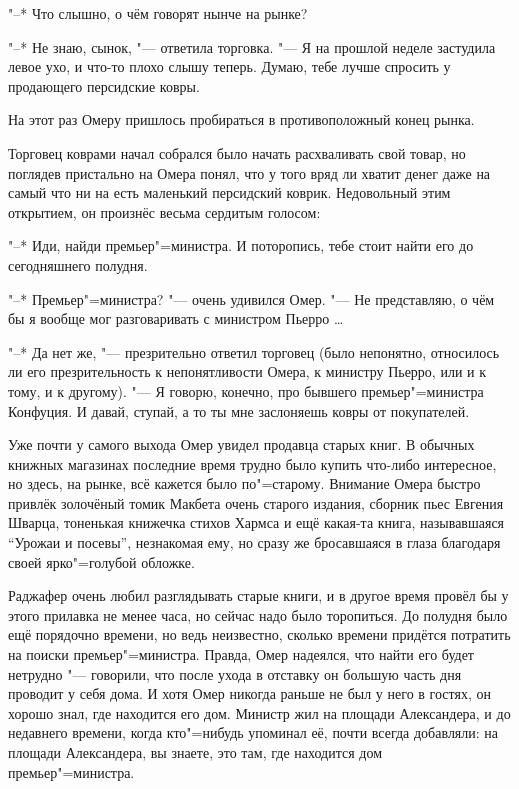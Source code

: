 "--* Что слышно, о чём говорят нынче на рынке?

"--* Не знаю, сынок, "--- ответила торговка.
"--- Я на прошлой неделе застудила левое ухо, и что-то плохо слышу теперь.
Думаю, тебе лучше спросить у продающего персидские ковры.

На этот раз Омеру пришлось пробираться в противоположный конец рынка.

Торговец коврами начал собрался было начать расхваливать свой товар, но поглядев
пристально на Омера понял, что у того вряд ли хватит денег даже на самый что ни
на есть маленький персидский коврик.
Недовольный этим открытием, он произнёс весьма сердитым голосом:

"--* Иди, найди премьер"=министра.
И поторопись, тебе стоит найти его до сегодняшнего полудня.

"--* Премьер"=министра? "--- очень удивился Омер.
"--- Не представляю, о чём бы я вообще мог разговаривать с министром
Пьерро \ldots

"--* Да нет же, "--- презрительно ответил торговец (было непонятно, относилось
ли его презрительность к непонятливости Омера, к министру Пьерро, или и к тому,
и к другому).
"--- Я говорю, конечно, про бывшего премьер"=министра Конфуция.
И давай, ступай, а то ты мне заслоняешь ковры от покупателей.

Уже почти у самого выхода Омер увидел продавца старых книг.
В обычных книжных магазинах последние время трудно было купить что-либо
интересное, но здесь, на рынке, всё кажется было по"=старому.
Внимание Омера быстро привлёк золочёный томик Макбета очень старого издания,
сборник пьес Евгения Шварца, тоненькая книжечка стихов Хармса и ещё какая-та
книга, называвшаяся \enquote{Урожаи и посевы}, незнакомая ему, но сразу же
бросавшаяся в глаза благодаря своей ярко"=голубой обложке.

Раджафер очень любил разглядывать старые книги, и в другое время провёл бы у
этого прилавка не менее часа, но сейчас надо было торопиться.
До полудня было ещё порядочно времени, но ведь неизвестно, сколько времени
придётся потратить на поиски премьер"=министра.
Правда, Омер надеялся, что найти его будет нетрудно "--- говорили, что после
ухода в отставку он большую часть дня проводит у себя дома.
И хотя Омер никогда раньше не был у него в гостях, он хорошо знал, где находится
его дом.
Министр жил на площади Александера, и до недавнего времени, когда кто"=нибудь
упоминал её, почти всегда добавляли: на площади Александера, вы знаете, это там,
где находится дом премьер"=министра.

